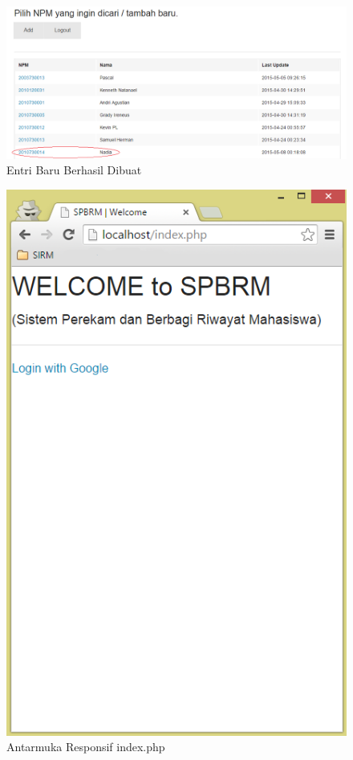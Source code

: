 \begin{figure}[H]
\centering
\includegraphics[scale=0.44]{Gambar/pengujian16.png}
\caption[Entri Baru Berhasil Dibuat]{Entri Baru Berhasil Dibuat} 
\label{fig:entribaruberhasil}
\end{figure}

\begin{figure}[H]
\centering
\includegraphics[scale=0.44]{Gambar/pengujian17.png}
\caption[Antarmuka Responsif index.php]{Antarmuka Responsif index.php} 
\label{fig:responsifindex}
\end{figure}

